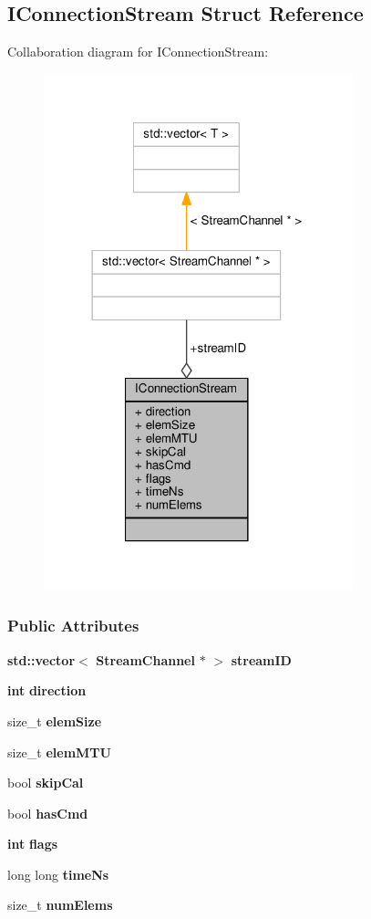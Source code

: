 \subsection{I\+Connection\+Stream Struct Reference}
\label{structIConnectionStream}


Collaboration diagram for I\+Connection\+Stream\+:
\nopagebreak
\begin{figure}[H]
\begin{center}
\leavevmode
\includegraphics[width=254pt]{d7/db3/structIConnectionStream__coll__graph}
\end{center}
\end{figure}
\subsubsection*{Public Attributes}
\begin{DoxyCompactItemize}
\item 
{\bf std\+::vector}$<$ {\bf Stream\+Channel} $\ast$ $>$ {\bf stream\+ID}
\item 
{\bf int} {\bf direction}
\item 
size\+\_\+t {\bf elem\+Size}
\item 
size\+\_\+t {\bf elem\+M\+TU}
\item 
bool {\bf skip\+Cal}
\item 
bool {\bf has\+Cmd}
\item 
{\bf int} {\bf flags}
\item 
long long {\bf time\+Ns}
\item 
size\+\_\+t {\bf num\+Elems}
\end{DoxyCompactItemize}


